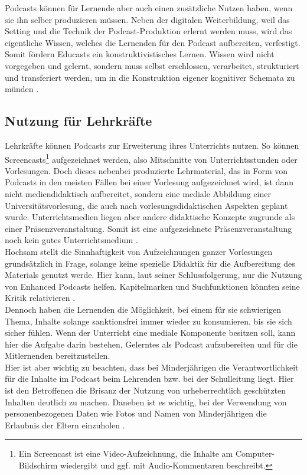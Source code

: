 \documentclass[11pt,a4paper]{scrreprt}
\begin{document}
Podcasts können für Lernende aber auch einen zusätzliche Nutzen haben, wenn sie ihn selber produzieren müssen. Neben der digitalen Weiterbildung, weil das Setting und die Technik der Podcast-Produktion erlernt werden muss, wird das eigentliche Wissen, welches die Lernenden für den Podcast aufbereiten, verfestigt. Somit fördern Educasts ein konstruktivistisches Lernen. Wissen wird nicht vorgegeben und gelernt, sondern muss selbst erschlossen, verarbeitet, strukturiert und transferiert werden, um in die Konstruktion eigener kognitiver Schemata zu münden \cite[S. 260]{Zorn2013}. 

\subsection{Nutzung für Lehrkräfte}
Lehrkräfte können Podcasts zur Erweiterung ihres Unterrichts nutzen. So können Screencasts\footnote{Ein Screencast ist eine Video-Aufzeichnung, die Inhalte am Computer-Bildschirm wiedergibt und ggf. mit Audio-Kommentaren beschreibt.} aufgezeichnet werden, also Mitschnitte von Unterrichtsstunden oder Vorlesungen. Doch dieses nebenbei produzierte Lehrmaterial, das in Form von Podcasts in den meisten Fällen bei einer Vorlesung aufgezeichnet wird, ist dann nicht mediendidaktisch aufbereitet, sondern eine mediale Abbildung einer Universitätsvorlesung, die auch nach vorlesungsdidaktischen Aspekten geplant wurde. Unterrichtsmedien liegen aber andere didaktische Konzepte zugrunde als einer Präsenzveranstaltung. Somit ist eine aufgezeichnete Präsenzveranstaltung noch kein gutes Unterrichtsmedium \cite[S. 21]{MandySchiefner2008}.\\ Hochsam stellt die Sinnhaftigkeit von Aufzeichnungen ganzer Vorlesungen grundsätzlich in Frage, solange keine spezielle Didaktik für die Aufbereitung des Materials genutzt werde. Hier kann, laut seiner Schlussfolgerung, nur die Nutzung von Enhanced Podcasts helfen. Kapitelmarken und Suchfunktionen könnten seine Kritik relativieren \cite[S. 47]{JuergenHochsam2008}.\\
Dennoch haben die Lernenden die Möglichkeit, bei einem für sie schwierigen Thema, Inhalte solange sanktionsfrei immer wieder zu konsumieren, bis sie sich sicher fühlen. Wenn der Unterricht eine mediale Komponente besitzen soll, kann hier die Aufgabe darin bestehen, Gelerntes als Podcast aufzubereiten und für die Mitlernenden bereitzustellen.\\
Hier ist aber wichtig zu beachten, dass bei Minderjährigen die Verantwortlichkeit für die Inhalte im Podcast beim Lehrenden bzw. bei der Schulleitung liegt. Hier ist den Betroffenen die Brisanz der Nutzung von urheberrechtlich geschützten Inhalten deutlich zu machen. Daneben ist es wichtig, bei der Verwendung von personenbezogenen Daten wie Fotos und Namen von Minderjährigen die Erlaubnis der Eltern einzuholen \cite[S. 262]{Zorn2013}.\\
\end{document}

